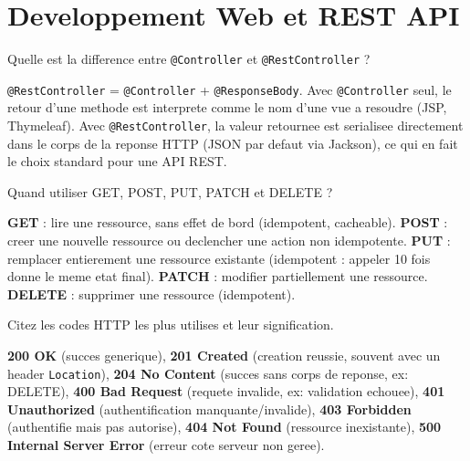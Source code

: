 \documentclass[11pt,a4paper]{article}
\begin{document}
\newpage
\section{Developpement Web et REST API}

\begin{question} Quelle est la difference entre \texttt{@Controller} et \texttt{@RestController} ?
\end{question}
\begin{reponse}
\texttt{@RestController} = \texttt{@Controller} + \texttt{@ResponseBody}. Avec \texttt{@Controller} seul, le retour d'une methode est interprete comme le nom d'une vue a resoudre (JSP, Thymeleaf). Avec \texttt{@RestController}, la valeur retournee est serialisee directement dans le corps de la reponse HTTP (JSON par defaut via Jackson), ce qui en fait le choix standard pour une API REST.
\end{reponse}

\begin{question} Quand utiliser GET, POST, PUT, PATCH et DELETE ?
\end{question}
\begin{reponse}
\textbf{GET} : lire une ressource, sans effet de bord (idempotent, cacheable). \textbf{POST} : creer une nouvelle ressource ou declencher une action non idempotente. \textbf{PUT} : remplacer entierement une ressource existante (idempotent : appeler 10 fois donne le meme etat final). \textbf{PATCH} : modifier partiellement une ressource. \textbf{DELETE} : supprimer une ressource (idempotent).
\end{reponse}

\begin{question} Citez les codes HTTP les plus utilises et leur signification.
\end{question}
\begin{reponse}
\textbf{200 OK} (succes generique), \textbf{201 Created} (creation reussie, souvent avec un header \texttt{Location}), \textbf{204 No Content} (succes sans corps de reponse, ex: DELETE), \textbf{400 Bad Request} (requete invalide, ex: validation echouee), \textbf{401 Unauthorized} (authentification manquante/invalide), \textbf{403 Forbidden} (authentifie mais pas autorise), \textbf{404 Not Found} (ressource inexistante), \textbf{500 Internal Server Error} (erreur cote serveur non geree).
\end{reponse}
\end{document}
